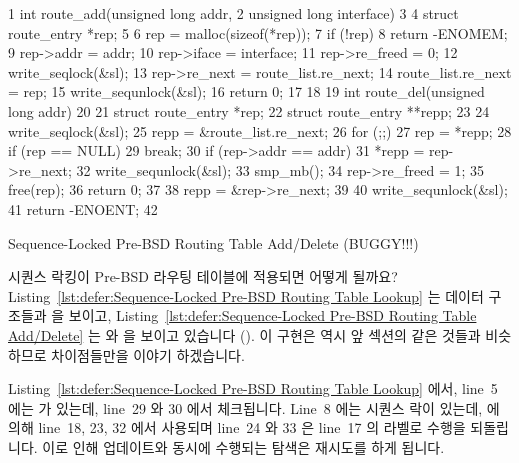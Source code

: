 \begin{listing}[tbp]
{ \scriptsize
\begin{verbbox}
 1 int route_add(unsigned long addr,
 2               unsigned long interface)
 3 {
 4   struct route_entry *rep;
 5
 6   rep = malloc(sizeof(*rep));
 7   if (!rep)
 8     return -ENOMEM;
 9   rep->addr = addr;
10   rep->iface = interface;
11   rep->re_freed = 0;
12   write_seqlock(&sl);
13   rep->re_next = route_list.re_next;
14   route_list.re_next = rep;
15   write_sequnlock(&sl);
16   return 0;
17 }
18
19 int route_del(unsigned long addr)
20 {
21   struct route_entry *rep;
22   struct route_entry **repp;
23
24   write_seqlock(&sl);
25   repp = &route_list.re_next;
26   for (;;) {
27     rep = *repp;
28     if (rep == NULL)
29       break;
30     if (rep->addr == addr) {
31       *repp = rep->re_next;
32       write_sequnlock(&sl);
33       smp_mb();
34       rep->re_freed = 1;
35       free(rep);
36       return 0;
37     }
38     repp = &rep->re_next;
39   }
40   write_sequnlock(&sl);
41   return -ENOENT;
42 }
\end{verbbox}
}
\centering
\theverbbox
\caption{Sequence-Locked Pre-BSD Routing Table Add/Delete (BUGGY!!!)}
\label{lst:defer:Sequence-Locked Pre-BSD Routing Table Add/Delete}
\end{listing}

시퀀스 락킹이 Pre-BSD 라우팅 테이블에 적용되면 어떻게 될까요?
Listing~\ref{lst:defer:Sequence-Locked Pre-BSD Routing Table Lookup}
는 데이터 구조들과  을 보이고, 
Listing~\ref{lst:defer:Sequence-Locked Pre-BSD Routing Table Add/Delete}
는  와  을 보이고 있습니다
().
이 구현은 역시 앞 섹션의 같은 것들과 비슷하므로 차이점들만을 이야기 하겠습니다.

Listing~\ref{lst:defer:Sequence-Locked Pre-BSD Routing Table Lookup} 에서,
line~5 에는  가 있는데, line~29 와 30 에서 체크됩니다.
Line~8 에는 시퀀스 락이 있는데,  에 의해 line~18, 23, 32
에서 사용되며 line~24 와 33 은 line~17 의  라벨로 수행을 되돌립니다.
이로 인해 업데이트와 동시에 수행되는 탐색은 재시도를 하게 됩니다.
\iffalse

